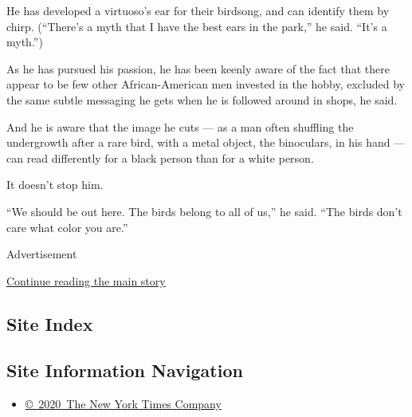 He has developed a virtuoso's ear for their birdsong, and can identify
them by chirp. (``There's a myth that I have the best ears in the
park,'' he said. ``It's a myth.'')

As he has pursued his passion, he has been keenly aware of the fact that
there appear to be few other African-American men invested in the hobby,
excluded by the same subtle messaging he gets when he is followed around
in shops, he said.

And he is aware that the image he cuts --- as a man often shuffling the
undergrowth after a rare bird, with a metal object, the binoculars, in
his hand --- can read differently for a black person than for a white
person.

It doesn't stop him.

``We should be out here. The birds belong to all of us,'' he said. ``The
birds don't care what color you are.''

Advertisement

\protect\hyperlink{after-bottom}{Continue reading the main story}

\hypertarget{site-index}{%
\subsection{Site Index}\label{site-index}}

\hypertarget{site-information-navigation}{%
\subsection{Site Information
Navigation}\label{site-information-navigation}}

\begin{itemize}
\tightlist
\item
  \href{https://help.nytimes3xbfgragh.onion/hc/en-us/articles/115014792127-Copyright-notice}{©~2020~The
  New York Times Company}
\end{itemize}

